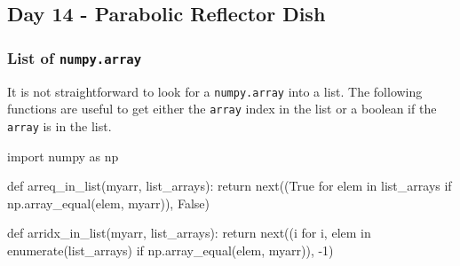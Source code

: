 \documentclass[]{scrartcl}
\begin{document}
\subsection{Day 14 - Parabolic Reflector Dish}

\subsubsection{List of \texttt{numpy.array}}

It is not straightforward to look for a \verb|numpy.array| into a list. The following functions are useful to get either the \verb|array| index in the list or a boolean if the \verb|array| is in the list.

\begin{ipython}
import numpy as np

def arreq_in_list(myarr, list_arrays):
    return next((True for elem in list_arrays 
                 if np.array_equal(elem, myarr)), False)

def arridx_in_list(myarr, list_arrays):
    return next((i for i, elem in enumerate(list_arrays) 
                 if np.array_equal(elem, myarr)), -1)
\end{ipython}
\end{document}
